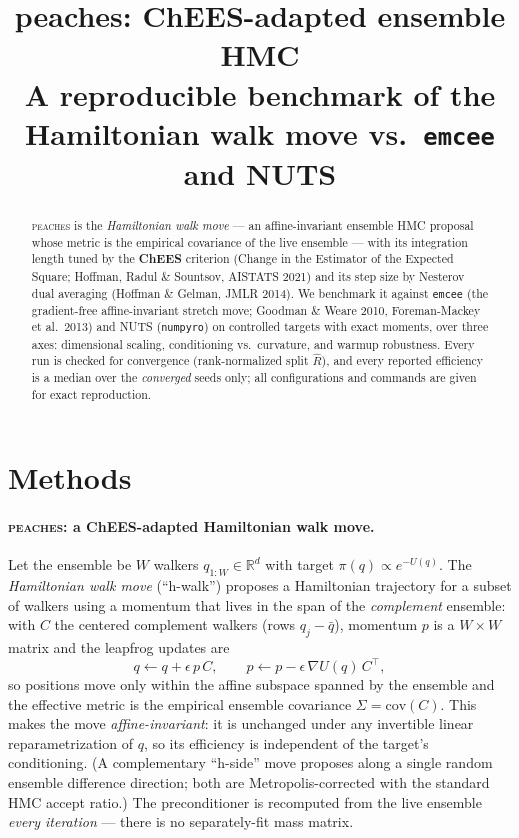 \documentclass[11pt]{article}
\title{\textbf{peaches}: ChEES-adapted ensemble HMC\\[2pt]
\large A reproducible benchmark of the Hamiltonian walk move vs.\ \texttt{emcee}
and NUTS}
\author{}
\date{}
\begin{document}
\maketitle

\begin{abstract}
\noindent
\textsc{peaches} is the \emph{Hamiltonian walk move} --- an affine-invariant
ensemble HMC proposal whose metric is the empirical covariance of the live
ensemble --- with its integration length tuned by the \textbf{ChEES} criterion
(Change in the Estimator of the Expected Square; Hoffman, Radul \& Sountsov,
AISTATS 2021) and its step size by Nesterov dual averaging (Hoffman \& Gelman,
JMLR 2014). We benchmark it against \texttt{emcee} (the gradient-free
affine-invariant stretch move; Goodman \& Weare 2010, Foreman-Mackey et al.\
2013) and NUTS (\texttt{numpyro}) on controlled targets with exact moments, over
three axes: dimensional scaling, conditioning vs.\ curvature, and warmup
robustness. Every run is checked for convergence (rank-normalized split
$\hat R$), and every reported efficiency is a median over the \emph{converged}
seeds only; all configurations and commands are given for exact reproduction.
\end{abstract}

\section{Methods}\label{sec:methods}

\paragraph{\textsc{peaches}: a ChEES-adapted Hamiltonian walk move.}
Let the ensemble be $W$ walkers $q_{1:W}\in\mathbb{R}^d$ with target
$\pi(q)\propto e^{-U(q)}$. The \emph{Hamiltonian walk move} (``h-walk'')
proposes a Hamiltonian trajectory for a subset of walkers using a momentum that
lives in the span of the \emph{complement} ensemble: with $C$ the centered
complement walkers (rows $q_j-\bar q$), momentum $p$ is a $W\!\times\!W$ matrix
and the leapfrog updates are
\[
q \leftarrow q + \epsilon\, p\,C,\qquad
p \leftarrow p - \epsilon\, \nabla U(q)\,C^{\!\top},
\]
so positions move only within the affine subspace spanned by the ensemble and
the effective metric is the empirical ensemble covariance
$\Sigma=\mathrm{cov}(C)$. This makes the move \emph{affine-invariant}: it is
unchanged under any invertible linear reparametrization of $q$, so its
efficiency is independent of the target's conditioning. (A complementary
``h-side'' move proposes along a single random ensemble difference direction;
both are Metropolis-corrected with the standard HMC accept ratio.) The
preconditioner is recomputed from the live ensemble \emph{every iteration} ---
there is no separately-fit mass matrix.
\end{document}
